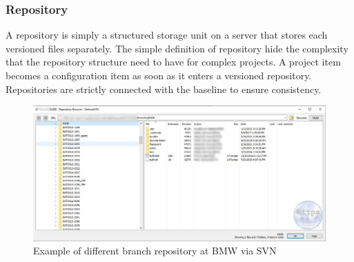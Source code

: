 \documentclass[../main.tex]{subfiles}
\begin{document}
\subsubsection{Repository}
A repository is simply a structured storage unit on a server that stores each versioned files separately. The simple definition of repository hide the complexity that the repository structure need to have for complex projects. A project item becomes a configuration item as soon as it enters a versioned repository. Repositories are strictly connected with the baseline to ensure consistency. 
\begin{figure}[H]
    \centering
    \includegraphics[width=\linewidth]{images_folder/repobroswer.png.jpg}
    \caption{Example of different branch repository at \gls{BMW} via SVN}
    \label{fig:BMWREPO}
\end{figure}
\end{document}

